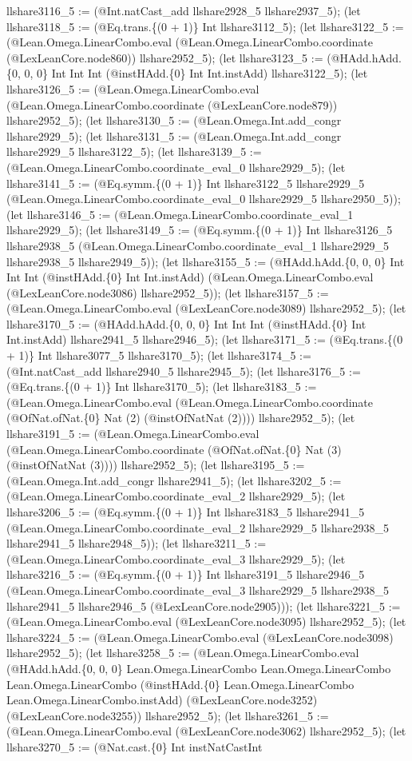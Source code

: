 \documentclass[11pt]{article}
\begin{document}
llshare3116\_5 := (@Int.natCast\_add llshare2928\_5 llshare2937\_5); (let llshare3118\_5 := (@Eq.trans.\{(0 + 1)\} Int llshare3112\_5); (let llshare3122\_5 := (@Lean.Omega.LinearCombo.eval (@Lean.Omega.LinearCombo.coordinate (@LexLeanCore.node860)) llshare2952\_5); (let llshare3123\_5 := (@HAdd.hAdd.\{0, 0, 0\} Int Int Int (@instHAdd.\{0\} Int Int.instAdd) llshare3122\_5); (let llshare3126\_5 := (@Lean.Omega.LinearCombo.eval (@Lean.Omega.LinearCombo.coordinate (@LexLeanCore.node879)) llshare2952\_5); (let llshare3130\_5 := (@Lean.Omega.Int.add\_congr llshare2929\_5); (let llshare3131\_5 := (@Lean.Omega.Int.add\_congr llshare2929\_5 llshare3122\_5); (let llshare3139\_5 := (@Lean.Omega.LinearCombo.coordinate\_eval\_0 llshare2929\_5); (let llshare3141\_5 := (@Eq.symm.\{(0 + 1)\} Int llshare3122\_5 llshare2929\_5 (@Lean.Omega.LinearCombo.coordinate\_eval\_0 llshare2929\_5 llshare2950\_5)); (let llshare3146\_5 := (@Lean.Omega.LinearCombo.coordinate\_eval\_1 llshare2929\_5); (let llshare3149\_5 := (@Eq.symm.\{(0 + 1)\} Int llshare3126\_5 llshare2938\_5 (@Lean.Omega.LinearCombo.coordinate\_eval\_1 llshare2929\_5 llshare2938\_5 llshare2949\_5)); (let llshare3155\_5 := (@HAdd.hAdd.\{0, 0, 0\} Int Int Int (@instHAdd.\{0\} Int Int.instAdd) (@Lean.Omega.LinearCombo.eval (@LexLeanCore.node3086) llshare2952\_5)); (let llshare3157\_5 := (@Lean.Omega.LinearCombo.eval (@LexLeanCore.node3089) llshare2952\_5); (let llshare3170\_5 := (@HAdd.hAdd.\{0, 0, 0\} Int Int Int (@instHAdd.\{0\} Int Int.instAdd) llshare2941\_5 llshare2946\_5); (let llshare3171\_5 := (@Eq.trans.\{(0 + 1)\} Int llshare3077\_5 llshare3170\_5); (let llshare3174\_5 := (@Int.natCast\_add llshare2940\_5 llshare2945\_5); (let llshare3176\_5 := (@Eq.trans.\{(0 + 1)\} Int llshare3170\_5); (let llshare3183\_5 := (@Lean.Omega.LinearCombo.eval (@Lean.Omega.LinearCombo.coordinate (@OfNat.ofNat.\{0\} Nat (2) (@instOfNatNat (2)))) llshare2952\_5); (let llshare3191\_5 := (@Lean.Omega.LinearCombo.eval (@Lean.Omega.LinearCombo.coordinate (@OfNat.ofNat.\{0\} Nat (3) (@instOfNatNat (3)))) llshare2952\_5); (let llshare3195\_5 := (@Lean.Omega.Int.add\_congr llshare2941\_5); (let llshare3202\_5 := (@Lean.Omega.LinearCombo.coordinate\_eval\_2 llshare2929\_5); (let llshare3206\_5 := (@Eq.symm.\{(0 + 1)\} Int llshare3183\_5 llshare2941\_5 (@Lean.Omega.LinearCombo.coordinate\_eval\_2 llshare2929\_5 llshare2938\_5 llshare2941\_5 llshare2948\_5)); (let llshare3211\_5 := (@Lean.Omega.LinearCombo.coordinate\_eval\_3 llshare2929\_5); (let llshare3216\_5 := (@Eq.symm.\{(0 + 1)\} Int llshare3191\_5 llshare2946\_5 (@Lean.Omega.LinearCombo.coordinate\_eval\_3 llshare2929\_5 llshare2938\_5 llshare2941\_5 llshare2946\_5 (@LexLeanCore.node2905))); (let llshare3221\_5 := (@Lean.Omega.LinearCombo.eval (@LexLeanCore.node3095) llshare2952\_5); (let llshare3224\_5 := (@Lean.Omega.LinearCombo.eval (@LexLeanCore.node3098) llshare2952\_5); (let llshare3258\_5 := (@Lean.Omega.LinearCombo.eval (@HAdd.hAdd.\{0, 0, 0\} Lean.Omega.LinearCombo Lean.Omega.LinearCombo Lean.Omega.LinearCombo (@instHAdd.\{0\} Lean.Omega.LinearCombo Lean.Omega.LinearCombo.instAdd) (@LexLeanCore.node3252) (@LexLeanCore.node3255)) llshare2952\_5); (let llshare3261\_5 := (@Lean.Omega.LinearCombo.eval (@LexLeanCore.node3062) llshare2952\_5); (let llshare3270\_5 := (@Nat.cast.\{0\} Int instNatCastInt 
\end{document}
